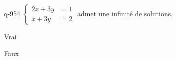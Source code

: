 \begin{truefalse}{q-954}
$\begin{cases}2x+3y &= 1 \\ x+3y &= 2\end{cases}$ admet une infinité de solutions.
\item Vrai
\item* Faux
\end{truefalse}

